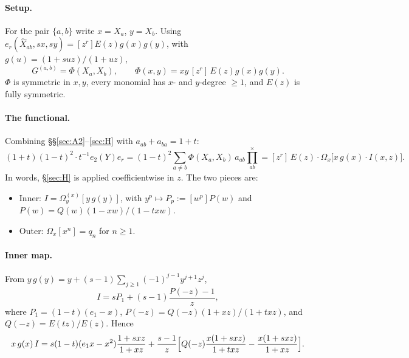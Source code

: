 \documentclass[11pt]{amsart}
\theoremstyle{remark}
\newcommand{\hX}{\widehat{X}}
\newcommand{\cross}{\textstyle\prod^{\times}}
\begin{document}
\paragraph{Setup.} For the pair $\{a,b\}$ write $x = X_a$, $y = X_b$. Using $e_r(\hX_{ab},sx,sy) = [z^r]E(z)g(x)g(y)$, with $g(u) = (1+suz)/(1+uz)$,
\[
G^{(a,b)} = \Phi(X_a,X_b),\qquad \Phi(x,y) = xy\,[z^r]\,E(z)g(x)g(y).
\]
$\Phi$ is symmetric in $x,y$, every monomial has $x$- and $y$-degree $\ge1$, and $E(z)$ is fully symmetric.

\paragraph{The functional.} Combining \S\S\ref{sec:A2}--\ref{sec:H} with $a_{ab}+a_{ba} = 1+t$:
\[
(1+t)(1-t)^2\cdot t^{-1}e_2(Y)e_r = (1-t)^2\sum_{a\ne b}\Phi(X_a,X_b)\,a_{ab}\cross_{ab} = [z^r]\,E(z)\cdot\Omega_x\bigl[x\,g(x)\cdot I(x,z)\bigr].
\]
In words, \S\ref{sec:H} is applied coefficientwise in $z$. The two pieces are:
\begin{itemize}
\item Inner: $I = \Omega_y^{(x)}[y\,g(y)]$, with $y^p\mapsto P_p := [w^p]P(w)$ and $P(w) = Q(w)(1-xw)/(1-txw)$.
\item Outer: $\Omega_x[x^n] = q_n$ for $n\ge1$.
\end{itemize}

\paragraph{Inner map.} From $y\,g(y) = y + (s-1)\sum_{j\ge1}(-1)^{j-1}y^{j+1}z^j$,
\[
I = sP_1 + (s-1)\frac{P(-z)-1}{z},
\]
where $P_1 = (1-t)(e_1-x)$, $P(-z) = Q(-z)(1+xz)/(1+txz)$, and $Q(-z) = E(tz)/E(z)$. Hence
\[
x\,g(x)\,I = s(1-t)(e_1x-x^2)\frac{1+sxz}{1+xz} + \frac{s-1}{z}\Bigl[Q(-z)\frac{x(1+sxz)}{1+txz} - \frac{x(1+sxz)}{1+xz}\Bigr].
\]
\end{document}
